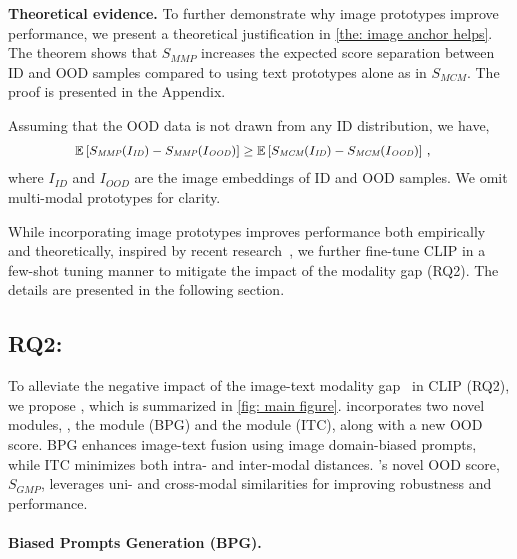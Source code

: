 \noindent
\textbf{Theoretical evidence.} 
To further demonstrate why image prototypes improve performance, we present a theoretical justification in \cref{the: image anchor helps}. 
The theorem shows that $S_{\textit{MMP}}$ increases the expected score separation between ID and OOD samples compared to using text prototypes alone as in $S_{\textit{MCM}}$. 
The proof is presented in the Appendix.
\begin{theorem}\label{the: image anchor helps} 
    Assuming that the %
    OOD data is not drawn from any ID distribution, we have,
    \begin{equation}
    \small
        \begin{aligned}
            & \mathbb{E}\left[ S_{\textit{MMP}}(I_{\textit{ID}}) - S_{\textit{MMP}}(I_{\textit{OOD}}) \right]             \geq \mathbb{E}\left[ S_{\textit{MCM}}(I_{\textit{ID}}) - S_{\textit{MCM}}(I_{\textit{OOD}}) \right]\,,
        \end{aligned}
    \end{equation}
    where $I_{\textit{ID}}$ and $I_{\textit{OOD}}$ are the image embeddings of ID and OOD samples. We omit multi-modal prototypes for clarity. %
\end{theorem}

While incorporating image prototypes improves performance both empirically and theoretically, inspired by recent research~\cite{miyai_locoop_2023,li_learning_2024}, we further fine-tune CLIP 
in a few-shot tuning manner to mitigate the impact of the modality gap (RQ2). The details are presented in the following section.

\subsection{RQ2: \ours}\label{sec: our method}

To alleviate the negative impact of the image-text modality gap~\cite{liang2022mind} in CLIP (RQ2), we propose \ours, which is summarized in \cref{fig: main figure}. 
\ours incorporates two novel modules, \ie, the {\BPG} module (BPG) and the {\ITC} module (ITC), along with a new OOD score. 
BPG enhances image-text fusion using image domain-biased prompts, while ITC minimizes both intra- and inter-modal distances. 
\ours's novel OOD score, $S_{\textit{GMP}}$, leverages uni- and cross-modal similarities for improving robustness and performance. 

\noindent
\paragraph{Biased Prompts Generation (BPG).}

